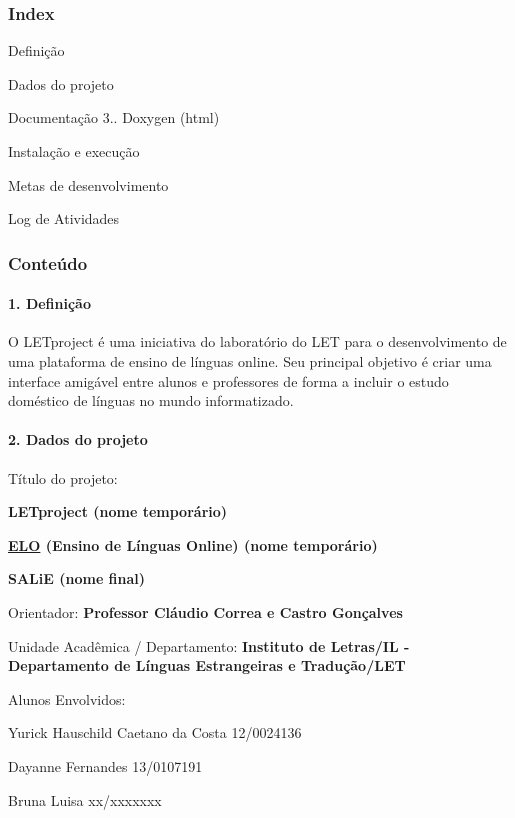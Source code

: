 \subsubsection*{Index}


\begin{DoxyEnumerate}
\item Definição
\item Dados do projeto
\item Documentação 3.. Doxygen (html)
\item Instalação e execução
\item Metas de desenvolvimento
\item Log de Atividades
\end{DoxyEnumerate}

\subsubsection*{Conteúdo}

\paragraph*{1. Definição}

O L\+E\+Tproject é uma iniciativa do laboratório do L\+E\+T para o desenvolvimento de uma plataforma de ensino de línguas online. Seu principal objetivo é criar uma interface amigável entre alunos e professores de forma a incluir o estudo doméstico de línguas no mundo informatizado.

\paragraph*{2. Dados do projeto}

Título do projeto\+:
\begin{DoxyItemize}
\item {\bfseries L\+E\+Tproject (nome temporário)}
\item {\bfseries \hyperlink{namespaceELO}{E\+L\+O} (Ensino de Línguas Online) (nome temporário)}
\item {\bfseries S\+A\+Li\+E (nome final)}
\end{DoxyItemize}

Orientador\+: {\bfseries Professor Cláudio Correa e Castro Gonçalves}

Unidade Acadêmica / Departamento\+: {\bfseries Instituto de Letras/\+I\+L -\/ Departamento de Línguas Estrangeiras e Tradução/\+L\+E\+T}

Alunos Envolvidos\+:
\begin{DoxyItemize}
\item Yurick Hauschild Caetano da Costa 12/0024136
\item Dayanne Fernandes 13/0107191
\item Bruna Luisa xx/xxxxxxx
\end{DoxyItemize}


